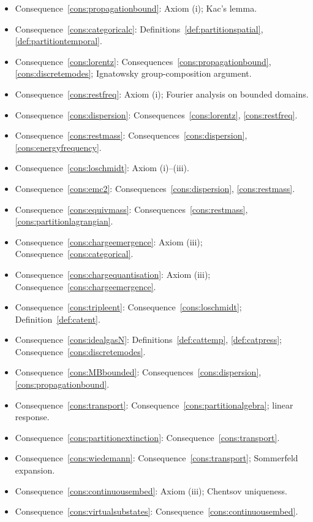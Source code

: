 \documentclass[11pt,twocolumn,a4paper]{article}
\theoremstyle{axiomstyle}
\theoremstyle{conseqstyle}
\theoremstyle{definition}
\theoremstyle{remark}
\begin{document}
\begin{itemize}
\item Consequence~\ref{cons:propagationbound}: Axiom (i); Kac's lemma.
\item Consequence~\ref{cons:categoricalc}: Definitions~\ref{def:partitionspatial}, \ref{def:partitiontemporal}.
\item Consequence~\ref{cons:lorentz}: Consequences~\ref{cons:propagationbound}, \ref{cons:discretemodes}; Ignatowsky group-composition argument.
\item Consequence~\ref{cons:restfreq}: Axiom (i); Fourier analysis on bounded domains.
\item Consequence~\ref{cons:dispersion}: Consequences~\ref{cons:lorentz}, \ref{cons:restfreq}.
\item Consequence~\ref{cons:restmass}: Consequences~\ref{cons:dispersion}, \ref{cons:energyfrequency}.
\item Consequence~\ref{cons:loschmidt}: Axiom (i)--(iii).
\item Consequence~\ref{cons:emc2}: Consequences~\ref{cons:dispersion}, \ref{cons:restmass}.
\item Consequence~\ref{cons:equivmass}: Consequences~\ref{cons:restmass}, \ref{cons:partitionlagrangian}.
\item Consequence~\ref{cons:chargeemergence}: Axiom (iii); Consequence~\ref{cons:categorical}.
\item Consequence~\ref{cons:chargequantisation}: Axiom (iii); Consequence~\ref{cons:chargeemergence}.
\item Consequence~\ref{cons:tripleent}: Consequence~\ref{cons:loschmidt}; Definition~\ref{def:catent}.
\item Consequence~\ref{cons:idealgasN}: Definitions~\ref{def:cattemp}, \ref{def:catpress}; Consequence~\ref{cons:discretemodes}.
\item Consequence~\ref{cons:MBbounded}: Consequences~\ref{cons:dispersion}, \ref{cons:propagationbound}.
\item Consequence~\ref{cons:transport}: Consequence~\ref{cons:partitionalgebra}; linear response.
\item Consequence~\ref{cons:partitionextinction}: Consequence~\ref{cons:transport}.
\item Consequence~\ref{cons:wiedemann}: Consequence~\ref{cons:transport}; Sommerfeld expansion.
\item Consequence~\ref{cons:continuousembed}: Axiom (iii); Chentsov uniqueness.
\item Consequence~\ref{cons:virtualsubstates}: Consequence~\ref{cons:continuousembed}.

\end{itemize}
\end{document}
